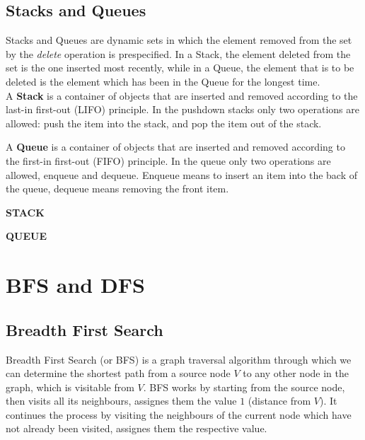 \documentclass[11pt,a4paper]{extarticle}
\begin{document}
\subsection{Stacks and Queues} 
Stacks and Queues are dynamic sets in which the element removed from the set by the \textit{delete} operation is prespecified. In a Stack, the element deleted from the set is the one inserted most recently, while in a Queue, the element that is to be deleted is the element which has been in the Queue for the longest time. \\

A \textbf{Stack} is a container of objects that are inserted and removed according to the last-in first-out (LIFO) principle. In the pushdown stacks only two operations are allowed: push the item into the stack, and pop the item out of the stack.

A \textbf{Queue} is a container of objects that are inserted and removed according to the first-in first-out (FIFO) principle. In the queue only two operations are allowed, enqueue and dequeue. Enqueue means to insert an item into the back of the queue, dequeue means removing the front item.
\newpage
\begin{multicols}{2}

\begin{center}
	\textbf{STACK}
\end{center}



\columnbreak

\begin{center}
	\textbf{QUEUE}
\end{center}



\end{multicols}

\section{BFS and DFS}
\subsection{Breadth First Search}
Breadth First Search (or BFS) is a graph traversal algorithm through which we can determine the shortest path from a source node $V$ to any other node in the graph, which is visitable from $V$. BFS works by starting from the source node, then visits all its neighbours, assignes them the value $1$ (distance from $V$). It continues the process by visiting the neighbours of the current node which have not already been visited, assignes them the respective value.
\end{document}
